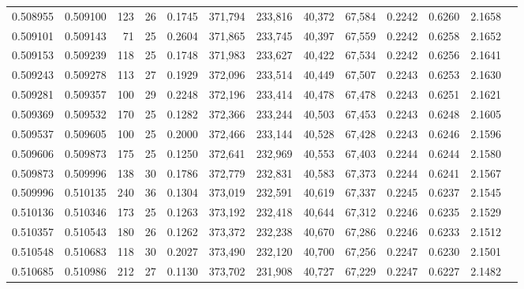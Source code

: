 \begin{tabular}{rrrrrrrrrrrrr}
0.508955 & 0.509100 &   123 &  26 &                                     0.1745 & 371,794 & 233,816 &  40,372 &  67,584 & 0.2242 & 0.6260 & 2.1658 \\
0.509101 & 0.509143 &    71 &  25 &                                     0.2604 & 371,865 & 233,745 &  40,397 &  67,559 & 0.2242 & 0.6258 & 2.1652 \\
0.509153 & 0.509239 &   118 &  25 &                                     0.1748 & 371,983 & 233,627 &  40,422 &  67,534 & 0.2242 & 0.6256 & 2.1641 \\
0.509243 & 0.509278 &   113 &  27 &                                     0.1929 & 372,096 & 233,514 &  40,449 &  67,507 & 0.2243 & 0.6253 & 2.1630 \\
0.509281 & 0.509357 &   100 &  29 &                                     0.2248 & 372,196 & 233,414 &  40,478 &  67,478 & 0.2243 & 0.6251 & 2.1621 \\
0.509369 & 0.509532 &   170 &  25 &                                     0.1282 & 372,366 & 233,244 &  40,503 &  67,453 & 0.2243 & 0.6248 & 2.1605 \\
0.509537 & 0.509605 &   100 &  25 &                                     0.2000 & 372,466 & 233,144 &  40,528 &  67,428 & 0.2243 & 0.6246 & 2.1596 \\
0.509606 & 0.509873 &   175 &  25 &                                     0.1250 & 372,641 & 232,969 &  40,553 &  67,403 & 0.2244 & 0.6244 & 2.1580 \\
0.509873 & 0.509996 &   138 &  30 &                                     0.1786 & 372,779 & 232,831 &  40,583 &  67,373 & 0.2244 & 0.6241 & 2.1567 \\
0.509996 & 0.510135 &   240 &  36 &                                     0.1304 & 373,019 & 232,591 &  40,619 &  67,337 & 0.2245 & 0.6237 & 2.1545 \\
0.510136 & 0.510346 &   173 &  25 &                                     0.1263 & 373,192 & 232,418 &  40,644 &  67,312 & 0.2246 & 0.6235 & 2.1529 \\
0.510357 & 0.510543 &   180 &  26 &                                     0.1262 & 373,372 & 232,238 &  40,670 &  67,286 & 0.2246 & 0.6233 & 2.1512 \\
0.510548 & 0.510683 &   118 &  30 &                                     0.2027 & 373,490 & 232,120 &  40,700 &  67,256 & 0.2247 & 0.6230 & 2.1501 \\
0.510685 & 0.510986 &   212 &  27 &                                     0.1130 & 373,702 & 231,908 &  40,727 &  67,229 & 0.2247 & 0.6227 & 2.1482 \\

\end{tabular}
